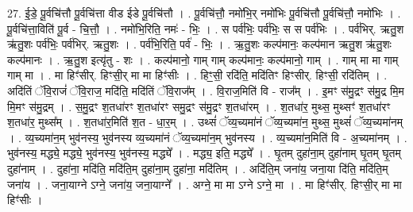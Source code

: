 \documentclass[17pt]{extarticle}
\begin{document}
27. ई॒डे॒ पू॒र्वचि॑त्तौ पू॒र्वचि॑त्ता वीड ईडे पू॒र्वचि॑त्तौ । . पू॒र्वचि॑त्तौ॒ नमो॑भि॒र् नमो॑भिः पू॒र्वचि॑त्तौ पू॒र्वचि॑त्तौ॒ नमो॑भिः । . पू॒र्वचि॑त्ता॒विति॑ पू॒र्व - चि॒त्तौ॒ । . नमो॑भि॒रिति॒ नमः॑ - भिः॒ । . स पर्व॑भिः॒ पर्व॑भिः॒ स स पर्व॑भिः । . पर्व॑भिर्. ऋतु॒श ऋ॑तु॒शः पर्व॑भिः॒ पर्व॑भिर्. ऋतु॒शः । . पर्व॑भि॒रिति॒ पर्व॑ - भिः॒ । . ऋ॒तु॒शः कल्प॑मानः॒ कल्प॑मान ऋतु॒श ऋ॑तु॒शः कल्प॑मानः । . ऋ॒तु॒श इत्यृ॑तु - शः । . कल्प॑मानो॒ गाम् गाम् कल्प॑मानः॒ कल्प॑मानो॒ गाम् । . गाम् मा मा गाम् गाम् मा । . मा हिꣳ॑सीर्. हिꣳसी॒र् मा मा हिꣳ॑सीः । . हिꣳ॒॒सी॒ रदि॑ति॒ मदि॑तिꣳ हिꣳसीर्. हिꣳसी॒ रदि॑तिम् । . अदि॑तिं ॅवि॒राजं॑ ॅवि॒राज॒ मदि॑ति॒ मदि॑तिं ॅवि॒राज᳚म् । . वि॒राज॒मिति॑ वि - राज᳚म् । . इ॒मꣳ स॑मु॒द्रꣳ स॑मु॒द्र मि॒म मि॒मꣳ स॑मु॒द्रम् । . स॒मु॒द्रꣳ श॒तधा॑रꣳ श॒तधा॑रꣳ समु॒द्रꣳ स॑मु॒द्रꣳ श॒तधा॑रम् । . श॒तधा॑र॒ मुथ्स॒ मुथ्सꣳ॑ श॒तधा॑रꣳ श॒तधा॑र॒ मुथ्स᳚म् । . श॒तधा॑र॒मिति॑ श॒त - धा॒र॒म् । . उथ्सं॑ ॅव्य॒च्यमा॑नं ॅव्य॒च्यमा॑न॒ मुथ्स॒ मुथ्सं॑ ॅव्य॒च्यमा॑नम् । . व्य॒च्यमा॑न॒म् भुव॑नस्य॒ भुव॑नस्य व्य॒च्यमा॑नं ॅव्य॒च्यमा॑न॒म् भुव॑नस्य । . व्य॒च्यमा॑न॒मिति॑ वि - अ॒च्यमा॑नम् । . भुव॑नस्य॒ मद्ध्ये॒ मद्ध्ये॒ भुव॑नस्य॒ भुव॑नस्य॒ मद्ध्ये᳚ । . मद्ध्य॒ इति॒ मद्ध्ये᳚ । . घृ॒तम् दुहा॑ना॒म् दुहा॑नाम् घृ॒तम् घृ॒तम् दुहा॑नाम् । . दुहा॑ना॒ मदि॑ति॒ मदि॑ति॒म् दुहा॑ना॒म् दुहा॑ना॒ मदि॑तिम् । . अदि॑ति॒म् जना॑य॒ जना॒या दि॑ति॒ मदि॑ति॒म् जना॑य । . जना॒याग्ने ऽग्ने॒ जना॑य॒ जना॒याग्ने᳚ । . अग्ने॒ मा मा ऽग्ने ऽग्ने॒ मा । . मा हिꣳ॑सीर्. हिꣳसी॒र् मा मा हिꣳ॑सीः । \newline
\end{document}
